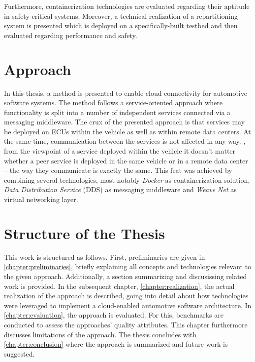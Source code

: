 Furthermore, containerization technologies are evaluated regarding their aptitude in safety-critical systems. Moreover, a technical realization of a repartitioning system is presented which is deployed on a specifically-built testbed and then evaluated regarding performance and safety.

%
%
%
%
%
%
%
%
%
%

\section{Approach}

In this thesis, a method is presented to enable cloud connectivity for automotive software systems. 
The method follows a service-oriented approach where functionality is split into a number of independent services connected via a messaging middleware. 
The crux of the presented approach is that services may be deployed on ECUs within the vehicle as well as within remote data centers. At the same time, communication between the services is not affected in any way. \Ie , from the viewpoint of a service deployed within the vehicle it doesn't matter whether a peer service is deployed in the same vehicle or in a remote data center -- the way they communicate is exactly the same.
This feat was achieved by combining several technologies, most notably \emph{Docker}\cite{DockerWebsite} as containerization solution, \emph{Data Distribution Service} (DDS) as messaging middleware and \emph{Weave Net}\cite{WeavenetWebsite} as virtual networking layer.

%
%
%
%
%
%
%
%
%
%

\section{Structure of the Thesis}

This work is structured as follows. First, preliminaries are given in \autoref{chapter:preliminaries}, briefly explaining all concepts and technologies relevant to the given approach. Additionally, a section summarizing and discusissing related work is provided. In the subsequent chapter, \autoref{chapter:realization}, the actual realization of the approach is described, going into detail about how technologies were leveraged to implement a cloud-enabled automotive software architecture. In \autoref{chapter:evaluation}, the approach is evaluated. For this, benchmarks are conducted to assess the approaches' quality attributes. This chapter furthermore discusses limitations of the approach. The thesis concludes with \autoref{chapter:conclusion} where the approach is summarized and future work is suggested.

%
%
%
%
%
%
%
%
%
%
%
%
%
%
%
%
%
%
%
%
%
%
%
%
%
%
%
%
%
%
%
%
%
%
%
%
%
%
